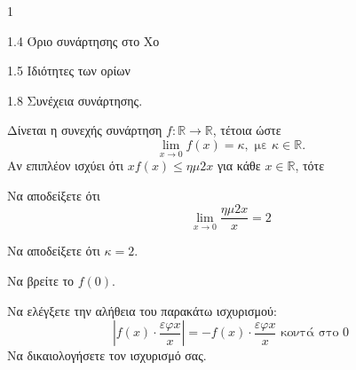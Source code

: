 \begin{ylh}{1}
    \item 1.4 Όριο συνάρτησης στο Χο
    \item 1.5 Ιδιότητες των ορίων
    \item 1.8 Συνέχεια συνάρτησης.
\end{ylh}
Δίνεται η συνεχής συνάρτηση $f: \mathbb{R} \to \mathbb{R}$, τέτοια ώστε
\[ \lim_{x \to 0} f(x) = \kappa, \text{ με } \kappa \in \mathbb{R}. \]
Αν επιπλέον ισχύει ότι $xf(x) \le \eta \mu 2x$ για κάθε $x \in \mathbb{R}$, τότε
\begin{alist}
\item Να αποδείξετε ότι
    \[ \lim_{x \to 0} \frac{\eta \mu 2x}{x} = 2 \]
\item Να αποδείξετε ότι $\kappa = 2$. 
\item Να βρείτε το $f(0)$. 
\item Να ελέγξετε την αλήθεια του παρακάτω ισχυρισμού:
    \[ \left| f(x) \cdot \frac{\varepsilon \varphi x}{x} \right| = -f(x) \cdot \frac{\varepsilon \varphi x}{x} \text{ κοντά στο } 0 \]
    Να δικαιολογήσετε τον ισχυρισμό σας. 
\end{alist}